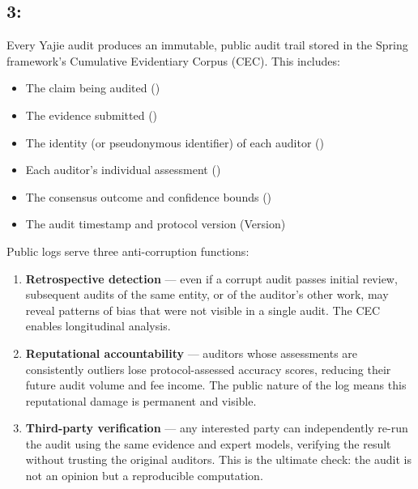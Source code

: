 \documentclass[12pt,a4paper]{article}
\theoremstyle{remark}
\begin{document}
\subsection{3:}
Every Yajie audit produces an immutable, public audit trail stored in the Spring 
framework's Cumulative Evidentiary Corpus (CEC). This includes:
\begin{itemize}[leftmargin=*, itemsep=4pt]
 \item The claim being audited ()
 \item The evidence submitted ()
 \item The identity (or pseudonymous identifier) of each auditor ()
 \item Each auditor's individual assessment ()
 \item The consensus outcome and confidence bounds ()
 \item The audit timestamp and protocol version (Version)
\end{itemize}
Public logs serve three anti-corruption functions:
\begin{enumerate}[label=(\arabic*), leftmargin=*]
 \item \textbf{Retrospective detection} --- even if a corrupt audit passes initial review, 
 subsequent audits of the same entity, or of the auditor's other work, may reveal 
 patterns of bias that were not visible in a single audit. The CEC enables 
 longitudinal analysis.
 \item \textbf{Reputational accountability} --- auditors whose assessments are 
 consistently outliers lose protocol-assessed accuracy scores, reducing their 
 future audit volume and fee income. The public nature of the log means this 
 reputational damage is permanent and visible.
 \item \textbf{Third-party verification} --- any interested party can independently 
 re-run the audit using the same evidence and expert models, verifying the 
 result without trusting the original auditors. This is the ultimate check: 
 the audit is not an opinion but a reproducible computation.
\end{enumerate}
\medskip
\end{document}
